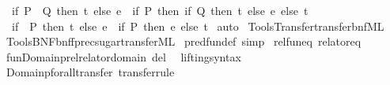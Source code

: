 \begin{isabellebody}
\ \ {\isachardoublequoteopen}{\isacharparenleft}{\kern0pt}if\ P\ {\isasymlongrightarrow}\ Q\ then\ t\ else\ e{\isacharparenright}{\kern0pt}\ {\isacharequal}{\kern0pt}\ {\isacharparenleft}{\kern0pt}if\ P\ then\ if\ Q\ then\ t\ else\ e\ else\ t{\isacharparenright}{\kern0pt}{\isachardoublequoteclose}\isanewline
\ \ {\isachardoublequoteopen}{\isacharparenleft}{\kern0pt}if\ {\isasymnot}\ P\ then\ t\ else\ e{\isacharparenright}{\kern0pt}\ {\isacharequal}{\kern0pt}\ {\isacharparenleft}{\kern0pt}if\ P\ then\ e\ else\ t{\isacharparenright}{\kern0pt}{\isachardoublequoteclose}\isanewline
%
\isadelimproof
%
\endisadelimproof
%
\isatagproof
{}\isamarkupfalse%
\ auto%
\endisatagproof
{\isafoldproof}%
%
\isadelimproof
\isanewline
%
\endisadelimproof
%
\isadelimML
\isanewline
%
\endisadelimML
%
\isatagML
{}\isamarkupfalse%
\ {\isacartoucheopen}Tools{\isacharslash}{\kern0pt}Transfer{\isacharslash}{\kern0pt}transfer{\isacharunderscore}{\kern0pt}bnf{\isachardot}{\kern0pt}ML{\isacartoucheclose}\isanewline
{}\isamarkupfalse%
\ {\isacartoucheopen}Tools{\isacharslash}{\kern0pt}BNF{\isacharslash}{\kern0pt}bnf{\isacharunderscore}{\kern0pt}fp{\isacharunderscore}{\kern0pt}rec{\isacharunderscore}{\kern0pt}sugar{\isacharunderscore}{\kern0pt}transfer{\isachardot}{\kern0pt}ML{\isacartoucheclose}%
\endisatagML
{\isafoldML}%
%
\isadelimML
\isanewline
%
\endisadelimML
\isanewline
{}\isamarkupfalse%
\ pred{\isacharunderscore}{\kern0pt}fun{\isacharunderscore}{\kern0pt}def\ {\isacharbrackleft}{\kern0pt}simp{\isacharbrackright}{\kern0pt}\isanewline
{}\isamarkupfalse%
\ rel{\isacharunderscore}{\kern0pt}fun{\isacharunderscore}{\kern0pt}eq\ {\isacharbrackleft}{\kern0pt}relator{\isacharunderscore}{\kern0pt}eq{\isacharbrackright}{\kern0pt}\isanewline
\isanewline
\isanewline
{}\isamarkupfalse%
\ fun{\isachardot}{\kern0pt}Domainp{\isacharunderscore}{\kern0pt}rel{\isacharbrackleft}{\kern0pt}relator{\isacharunderscore}{\kern0pt}domain\ del{\isacharbrackright}{\kern0pt}%
\isadelimdocument
%
\endisadelimdocument
%
\isatagdocument
%
\isamarkuptrue%
%
\endisatagdocument
{\isafolddocument}%
%
\isadelimdocument
%
\endisadelimdocument
{}\isamarkupfalse%
\ \ lifting{\isacharunderscore}{\kern0pt}syntax\isanewline
{}\isanewline
\isanewline
{}\isamarkupfalse%
\ Domainp{\isacharunderscore}{\kern0pt}forall{\isacharunderscore}{\kern0pt}transfer\ {\isacharbrackleft}{\kern0pt}transfer{\isacharunderscore}{\kern0pt}rule{\isacharbrackright}{\kern0pt}{\isacharcolon}{\kern0pt}\isanewline

\end{isabellebody}
